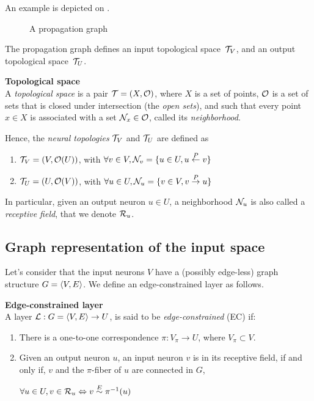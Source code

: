 An example is depicted on .

\begin{figure}[H]
\centering
{}
\caption{A propagation graph}
\label{fig:pgraph}
\end{figure}


The propagation graph defines an input topological space~$\mathcal{T}_V$, and an output topological space~$\mathcal{T}_U$.

\begin{definition}\textbf{Topological space}\\
A \emph{topological space} is a pair $\mathcal{T} = (X, \mathcal{O})$, where $X$ is a set of points, $\mathcal{O}$ is a set of sets that is closed under intersection (the \emph{open sets}), and such that every point $x \in X$ is associated with a set $\mathcal{N}_x \in \mathcal{O}$, called its \emph{neighborhood}.
\end{definition}

Hence, the \emph{neural topologies} $\mathcal{T}_V$ and $\mathcal{T}_U$ are defined as
\begin{enumerate}
\item $\mathcal{T}_V = (V, \mathcal{O}(U))$, with $\forall v \in V, \mathcal{N}_v = \{u \in U, u \overset{P}\leftarrow v \}$
\item $\mathcal{T}_U = (U, \mathcal{O}(V))$, with $\forall u \in U, \mathcal{N}_u = \{v \in V, v \overset{P}\rightarrow u \}$
\end{enumerate}

In particular, given an output neuron $u \in U$, a neighborhood $\mathcal{N}_u$ is also called a \emph{receptive field}, that we denote $\mathcal{R}_u$.

\subsection{Graph representation of the input space}

Let's consider that the input neurons $V$ have a (possibly edge-less) graph structure $G = \langle V, E \rangle$. We define an edge-constrained layer as follows.

\begin{definition}\textbf{Edge-constrained layer}\\
A layer $\mathcal{L}: G = \langle V, E \rangle \rightarrow U$, is said to be \emph{edge-constrained} (EC) if:
\begin{enumerate}
  \item There is a one-to-one correspondence $\pi: V_\pi \rightarrow U$, where $V_\pi \subset V$.
  \item Given an output neuron $u$, an input neuron $v$ is in its receptive field, if and only if, $v$ and the $\pi$-fiber of $u$ are connected in $G$,\\
  \centerline{\ie $\forall u \in U, v \in \mathcal{R}_u \Leftrightarrow v \overset{E}\sim \pi^{-1}(u) $}
\end{enumerate}
\end{definition}

